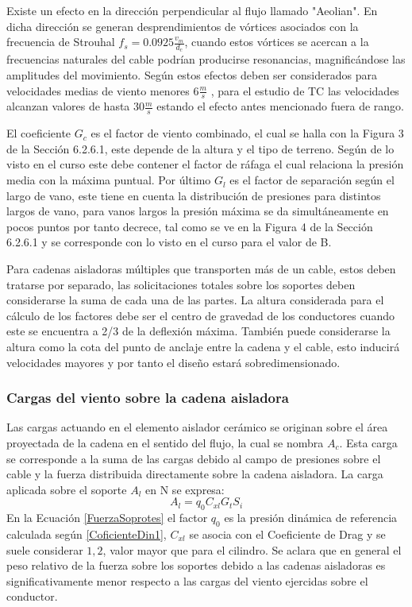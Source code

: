 Existe un efecto en la dirección perpendicular al flujo  llamado "Aeolian". En dicha dirección se generan desprendimientos de vórtices asociados con la frecuencia de Strouhal $f_s=0.0925\frac{v_m}{d_c}$, cuando estos vórtices se acercan a la frecuencias naturales del cable podrían producirse resonancias, magnificándose las amplitudes del movimiento. Según \cite{Belloli2006} estos efectos deben ser considerados para velocidades medias de viento menores $6\frac{m}{s}$ , para el estudio de \gls{TC} las velocidades alcanzan valores de hasta $30\frac{m}{s}$ estando el efecto antes mencionado fuera de rango. 


El coeficiente $G_c$ es el factor de viento combinado, el cual se halla con la Figura 3 de la Sección 6.2.6.1,  este depende de la altura y el tipo de terreno.
Según de lo visto en el curso este debe contener el factor de ráfaga el cual relaciona la presión media con la máxima puntual. Por último $G_l$ es el factor de separación según el largo de vano, este tiene en cuenta la distribución de presiones para distintos largos de vano, para vanos largos la presión máxima se da simultáneamente en pocos puntos por tanto decrece, tal como se ve en la Figura 4 de la Sección 6.2.6.1 y se corresponde con lo visto en el curso para el valor de B.



Para cadenas aisladoras múltiples que transporten  más de un cable, estos deben tratarse por separado, las solicitaciones totales sobre los soportes deben considerarse la suma de cada una de las partes. La altura considerada para el cálculo de los factores debe ser el centro de gravedad de los conductores cuando este se encuentra a 2/3 de la deflexión máxima. También puede considerarse la altura como la cota del punto de anclaje entre la cadena y el cable, esto inducirá velocidades mayores y por tanto el diseño estará sobredimensionado. 


\subsubsection{Cargas del viento sobre la cadena aisladora}
Las cargas actuando en el elemento aislador cerámico se originan sobre el área proyectada de la cadena en el sentido del flujo, la cual se nombra $A_c$. Esta carga se corresponde a la suma de las cargas debido al campo de presiones sobre el cable y la fuerza distribuida directamente sobre la cadena aisladora. La carga aplicada sobre el soporte $A_l$ en N se expresa: 
\begin{equation} \label{FuerzaSoprotes}
	A_l=q_0C_{xl}G_tS_i
\end{equation}
En la Ecuación \ref{FuerzaSoprotes} el factor $q_0$ es la presión dinámica de referencia calculada según \ref{CoficienteDin1}, $C_{xl}$ se asocia con el Coeficiente de Drag y se suele considerar $1,2$, valor mayor que para el cilindro. Se aclara que en general el peso relativo de la fuerza sobre los soportes debido a las cadenas aisladoras es significativamente menor respecto a las cargas del viento ejercidas sobre el conductor. 



